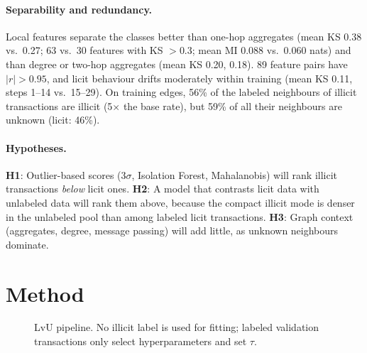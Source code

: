 \documentclass[11pt]{article}
\newcommand{\ours}{LvU}
\begin{document}
\paragraph{Separability and redundancy.}
Local features separate the classes better than one-hop aggregates (mean KS 0.38 vs.\ 0.27; 63 vs.\ 30 features with KS $>0.3$; mean MI 0.088 vs.\ 0.060 nats) and than degree or two-hop aggregates (mean KS 0.20, 0.18).
89 feature pairs have $|r|>0.95$, and licit behaviour drifts moderately within training (mean KS 0.11, steps 1--14 vs.\ 15--29).
On training edges, 56\% of the labeled neighbours of illicit transactions are illicit (5$\times$ the base rate), but 59\% of all their neighbours are unknown (licit: 46\%).

\paragraph{Hypotheses.}
\textbf{H1}: Outlier-based scores (3$\sigma$, Isolation Forest, Mahalanobis) will rank illicit transactions \emph{below} licit ones.
\textbf{H2}: A model that contrasts licit data with unlabeled data will rank them above, because the compact illicit mode is denser in the unlabeled pool than among labeled licit transactions.
\textbf{H3}: Graph context (aggregates, degree, message passing) will add little, as unknown neighbours dominate.

\section{Method}
\label{sec:method}

\begin{figure}[t]
\centering
{}
\caption{\ours{} pipeline. No illicit label is used for fitting; labeled validation transactions only select hyperparameters and set $\tau$.}
\label{fig:pipeline}
\end{figure}
\end{document}
